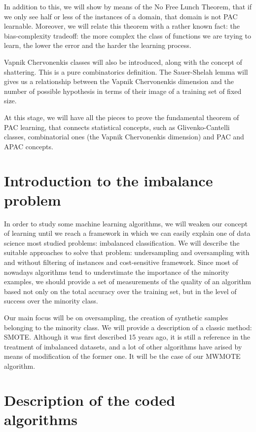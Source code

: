 In addition to this, we will show by means of the No Free Lunch Theorem, that if we only see half or less of the instances 
of a domain, that domain is not PAC learnable. Moreover, we will relate this theorem with a rather known fact: the 
bias-complexity tradeoff: the more complex the class of functions we are trying to learn, the lower the error and the
harder the learning process.

Vapnik Chervonenkis classes will also be introduced, along with the concept of shattering. This is a pure combinatorics
definition. The Sauer-Shelah lemma will gives us a relationship between the Vapnik Chervonenkis dimension and the number
of possible hypothesis in terms of their image of a training set of fixed size. 

At this stage, we will have all the pieces to prove the fundamental theorem of PAC learning, that connects statistical
concepts, such as Glivenko-Cantelli classes, combinatorial ones (the Vapnik Chervonenkis dimension) and PAC and APAC
concepts.

\section*{Introduction to the imbalance problem}

In order to study some machine learning algorithms, we will weaken our concept of learning until we reach a framework in which
we can easily explain one of data science most studied problems: imbalanced classification. We will describe the suitable
approaches to solve that problem: undersampling and oversampling with and without filtering of instances and cost-sensitive 
framework. Since most of nowadays algorithms tend to understimate the importance of the minority examples, 
we should provide a set of measurements of the quality of an algorithm based not only on the total accuracy over the training
set, but in the level of success over the minority class.

Our main focus will be on oversampling, the creation of synthetic samples belonging to the minority class. We will provide
a description of a classic method: SMOTE. Although it was first described 15 years ago, it is still a reference in the
treatment of imbalanced datasets, and a lot of other algorithms have arised by means of modification of the former one. It will be the case
of our MWMOTE algorithm.

\section*{Description of the coded algorithms}

